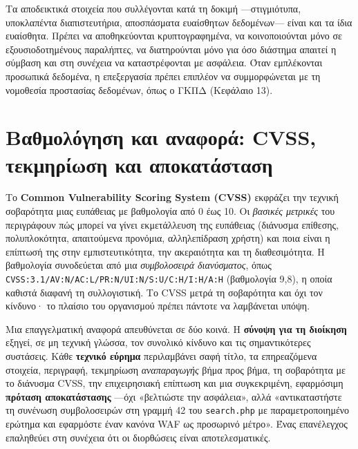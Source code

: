 \documentclass[11pt,openany]{book}
\begin{document}
Τα αποδεικτικά στοιχεία που συλλέγονται κατά τη δοκιμή —στιγμιότυπα, υποκλαπέντα διαπιστευτήρια, αποσπάσματα ευαίσθητων δεδομένων— είναι και τα ίδια ευαίσθητα. Πρέπει να αποθηκεύονται κρυπτογραφημένα, να κοινοποιούνται μόνο σε εξουσιοδοτημένους παραλήπτες, να διατηρούνται μόνο για όσο διάστημα απαιτεί η σύμβαση και στη συνέχεια να καταστρέφονται με ασφάλεια. Όταν εμπλέκονται προσωπικά δεδομένα, η επεξεργασία πρέπει επιπλέον να συμμορφώνεται με τη νομοθεσία προστασίας δεδομένων, όπως ο ΓΚΠΔ (Κεφάλαιο 13).

\section{Βαθμολόγηση και αναφορά: CVSS, τεκμηρίωση και αποκατάσταση}\label{sec:10.6}
Το \textbf{Common Vulnerability Scoring System (CVSS)} εκφράζει την τεχνική σοβαρότητα μιας ευπάθειας με βαθμολογία από 0 έως 10. Οι \emph{βασικές μετρικές} του περιγράφουν πώς μπορεί να γίνει εκμετάλλευση της ευπάθειας (διάνυσμα επίθεσης, πολυπλοκότητα, απαιτούμενα προνόμια, αλληλεπίδραση χρήστη) και ποια είναι η επίπτωσή της στην εμπιστευτικότητα, την ακεραιότητα και τη διαθεσιμότητα. Η βαθμολογία συνοδεύεται από μια \emph{συμβολοσειρά διανύσματος}, όπως \texttt{CVSS:3.1/AV:N/AC:L/PR:N/UI:N/S:U/C:H/I:H/A:H} (βαθμολογία 9,8), η οποία καθιστά διαφανή τη συλλογιστική. Το CVSS μετρά τη σοβαρότητα και όχι τον κίνδυνο· το πλαίσιο του οργανισμού πρέπει πάντοτε να λαμβάνεται υπόψη.

Μια επαγγελματική αναφορά απευθύνεται σε δύο κοινά. Η \textbf{σύνοψη για τη διοίκηση} εξηγεί, σε μη τεχνική γλώσσα, τον συνολικό κίνδυνο και τις σημαντικότερες συστάσεις. Κάθε \textbf{τεχνικό εύρημα} περιλαμβάνει σαφή τίτλο, τα επηρεαζόμενα στοιχεία, περιγραφή, τεκμηρίωση \emph{αναπαραγωγής} βήμα προς βήμα, τη σοβαρότητα με το διάνυσμα CVSS, την επιχειρησιακή επίπτωση και μια συγκεκριμένη, εφαρμόσιμη \textbf{πρόταση αποκατάστασης} —όχι «βελτιώστε την ασφάλεια», αλλά «αντικαταστήστε τη συνένωση συμβολοσειρών στη γραμμή 42 του \texttt{search.php} με παραμετροποιημένο ερώτημα και εφαρμόστε έναν κανόνα WAF ως προσωρινό μέτρο». Ένας επανέλεγχος επαληθεύει στη συνέχεια ότι οι διορθώσεις είναι αποτελεσματικές.
\end{document}
